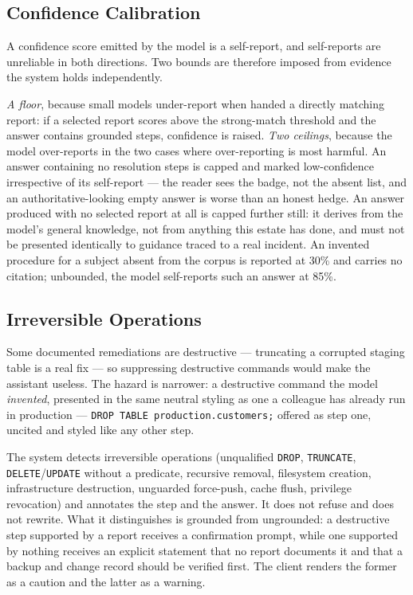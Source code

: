 \documentclass[12pt, a4paper]{article}
\begin{document}
\subsection{Confidence Calibration}

A confidence score emitted by the model is a self-report, and self-reports are unreliable in both directions. Two bounds are therefore imposed from evidence the system holds independently.

\emph{A floor}, because small models under-report when handed a directly matching report: if a selected report scores above the strong-match threshold and the answer contains grounded steps, confidence is raised. \emph{Two ceilings}, because the model over-reports in the two cases where over-reporting is most harmful. An answer containing no resolution steps is capped and marked low-confidence irrespective of its self-report --- the reader sees the badge, not the absent list, and an authoritative-looking empty answer is worse than an honest hedge. An answer produced with no selected report at all is capped further still: it derives from the model's general knowledge, not from anything this estate has done, and must not be presented identically to guidance traced to a real incident. An invented procedure for a subject absent from the corpus is reported at 30\% and carries no citation; unbounded, the model self-reports such an answer at 85\%.

\subsection{Irreversible Operations}

Some documented remediations are destructive --- truncating a corrupted staging table is a real fix --- so suppressing destructive commands would make the assistant useless. The hazard is narrower: a destructive command the model \emph{invented}, presented in the same neutral styling as one a colleague has already run in production --- \texttt{DROP TABLE production.customers;} offered as step one, uncited and styled like any other step.

The system detects irreversible operations (unqualified \texttt{DROP}, \texttt{TRUNCATE}, \texttt{DELETE}/\texttt{UPDATE} without a predicate, recursive removal, filesystem creation, infrastructure destruction, unguarded force-push, cache flush, privilege revocation) and annotates the step and the answer. It does not refuse and does not rewrite. What it distinguishes is grounded from ungrounded: a destructive step supported by a report receives a confirmation prompt, while one supported by nothing receives an explicit statement that no report documents it and that a backup and change record should be verified first. The client renders the former as a caution and the latter as a warning.
\end{document}
